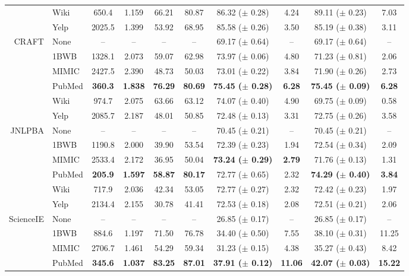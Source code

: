 \documentclass[11pt,a4paper]{article}
\begin{document}
\begin{table*}[ht!]
\begin{small}
\begin{center}
\begin{tabular}{r l | c c c c | c c | c c }
 & Wiki & \phantom{0}650.4 & 1.159 & 66.21 & 80.87 & 86.32 ($\pm$ 0.28) & 4.24 & 89.11 ($\pm$ 0.23) & 7.03 \\
 & Yelp & 2025.5 & 1.399 & 53.92 & 68.95 & 85.58 ($\pm$ 0.26) & 3.50 & 85.19 ($\pm$ 0.38) & 3.11 \\
\midrule
\multirow{6}{*}{CRAFT} & None & -- & -- & -- & -- & 69.17 ($\pm$ 0.64) & -- & 69.17 ($\pm$ 0.64) & -- \\ 
 & 1BWB & 1328.1 & 2.073 & 59.07 & 62.98 & 73.97 ($\pm$ 0.06) & 4.80 & 71.23 ($\pm$ 0.81) & 2.06 \\
 & MIMIC & 2427.5 & 2.390 & 48.73 & 50.03 & 73.01 ($\pm$ 0.22) & 3.84 & 71.90 ($\pm$ 0.26) & 2.73 \\
 & PubMed & \bf \phantom{0}360.3 & \bf 1.838 & \bf 76.29 & \bf 80.69 & \bf 75.45 ($\pm$ 0.28) & \bf 6.28 & \bf 75.45 ($\pm$ 0.09) & \bf 6.28 \\
 & Wiki & \phantom{0}974.7 & 2.075 & 63.66 & 63.12 & 74.07 ($\pm$ 0.40) & 4.90 & 69.75 ($\pm$ 0.09) & 0.58 \\
 & Yelp & 2085.7 & 2.187 & 48.01 & 50.85 & 72.48 ($\pm$ 0.13) & 3.31 & 72.75 ($\pm$ 0.26) & 3.58 \\
\midrule
\multirow{6}{*}{JNLPBA} & None & -- & -- & -- & -- & 70.45 ($\pm$ 0.21) & -- & 70.45 ($\pm$ 0.21) & -- \\ 
 & 1BWB & 1190.8 & 2.000 & 39.90 & 53.54 & 72.39 ($\pm$ 0.23) & 1.94 & 72.54 ($\pm$ 0.34) & 2.09 \\
 & MIMIC & 2533.4 & 2.172 & 36.95 & 50.04 & \bf 73.24 ($\pm$ 0.29) & \bf 2.79 & 71.76 ($\pm$ 0.13) & 1.31 \\
 & PubMed & \bf \phantom{0}205.9 & \bf 1.597 & \bf 58.87 & \bf 80.17 & 72.77 ($\pm$ 0.65) & 2.32 & \bf 74.29 ($\pm$ 0.40) & \bf 3.84 \\
 & Wiki & \phantom{0}717.9 & 2.036 & 42.34 & 53.05 & 72.77 ($\pm$ 0.27) & 2.32 & 72.42 ($\pm$ 0.23) & 1.97 \\
 & Yelp & 2134.4 & 2.155 & 30.78 & 41.41 & 72.53 ($\pm$ 0.18) & 2.08 & 72.51 ($\pm$ 0.21) & 2.06 \\
\midrule
\multirow{6}{*}{ScienceIE} & None & -- & -- & -- & -- & 26.85 ($\pm$ 0.17) & -- & 26.85 ($\pm$ 0.17) & -- \\ 
 & 1BWB & \phantom{0}884.6 & 1.197 & 71.50 & 76.78 & 34.40 ($\pm$ 0.50) & 7.55 & 38.10 ($\pm$ 0.31) & 11.25 \\
 & MIMIC & 2706.7 & 1.461 & 54.29 & 59.34 & 31.23 ($\pm$ 0.15) & 4.38 & 35.27 ($\pm$ 0.43) & 8.42 \\
 & PubMed & \bf \phantom{0}345.6 & \bf 1.037 & \bf 83.25 & \bf 87.01 & \bf 37.91 ($\pm$ 0.12) & \bf 11.06 & \bf 42.07 ($\pm$ 0.03) & \bf 15.22 \\

\end{tabular}
\end{center}
\end{small}
\end{table*}
\end{document}
